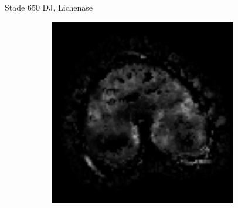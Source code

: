 \documentclass[10pt]{beamer}
\begin{document}
\begin{frame}{Stade 650 DJ, Lichenase}
\begin{figure}[ht]
\begin{subfigure}[t]{0.33\textwidth}
      
    \end{subfigure}%
    \begin{subfigure}[t]{0.33\textwidth}
      \centering
      \includegraphics[width=0.9\textwidth]{fig/stats_650Lich_density}

    \end{subfigure}%
    
  \end{figure}
  
\end{frame}
\end{document}
